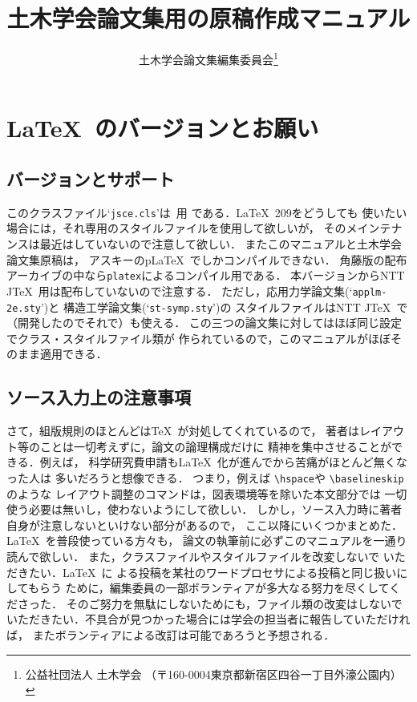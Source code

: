 \documentclass[onecolumn]{jsce}  %
\title{土木学会論文集用の原稿作成マニュアル}
\author{土木学会論文集編集委員会\thanks{公益社団法人 土木学会
（〒160-0004東京都新宿区四谷一丁目外濠公園内）\email{03-3355-3441}}}
\begin{document}
\maketitle

\renewcommand{\baselinestretch}{0.95}\small
\begin{quote}
\tableofcontents
\end{quote}
\renewcommand{\baselinestretch}{1}\small\normalsize

\section{\LaTeX\ のバージョンとお願い}
\label{sec:1}

\subsection{バージョンとサポート}

このクラスファイル`{\tt jsce.cls}'は\LaTeXe\ 用
である．\LaTeX\ 209をどうしても
使いたい場合には，それ専用のスタイルファイルを使用して欲しいが，
そのメインテナンスは最近はしていないので注意して欲しい．
またこのマニュアルと土木学会論文集原稿は，
アスキーのp\LaTeX\ でしかコンパイルできない．
角藤版の配布アーカイブの中なら{\tt platex}によるコンパイル用である．
本バージョンからNTT J\TeX\ 用は配布していないので注意する．
ただし，応用力学論文集(`{\tt applm-2e.sty}')と
構造工学論文集(`{\tt st-symp.sty}')の
スタイルファイルはNTT J\TeX\ で（開発したのでそれで）も使える．
この三つの論文集に対してはほぼ同じ設定でクラス・スタイルファイル類が
作られているので，このマニュアルがほぼそのまま適用できる．

\subsection{ソース入力上の注意事項}

さて，組版規則のほとんどは\TeX\ が対処してくれているので，
著者はレイアウト等のことは一切考えずに，論文の論理構成だけに
精神を集中させることができる．例えば，
科学研究費申請も\LaTeX\ 化が進んでから苦痛がほとんど無くなった人は
多いだろうと想像できる．
つまり，例えば \verb+\hspace+や \verb+\baselineskip+のような
レイアウト調整のコマンドは，図表環境等を除いた本文部分では
一切使う必要は無いし，使わないようにして欲しい．
しかし，ソース入力時に著者自身が注意しないといけない部分があるので，
ここ以降にいくつかまとめた．\LaTeX\ を普段使っている方々も，
論文の執筆前に必ずこのマニュアルを一通り読んで欲しい．
また，クラスファイルやスタイルファイルを改変しないで
いただきたい．\LaTeX\ に
よる投稿を某社のワードプロセサによる投稿と同じ扱いにしてもらう
ために，編集委員の一部ボランティアが多大なる努力を尽くしてくださった．
そのご努力を無駄にしないためにも，ファイル類の改変はしないで
いただきたい．不具合が見つかった場合には学会の担当者に報告していただければ，
またボランティアによる改訂は可能であろうと予想される．
\end{document}

